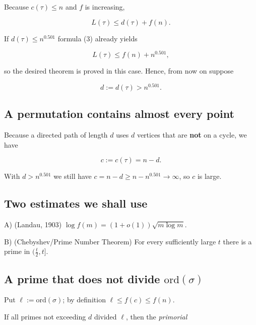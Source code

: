 \documentclass[12pt,a4paper]{article}
\theoremstyle{definition}
\begin{document}
    Because $c(\tau) \leq n$ and $f$ is increasing,

    \begin{equation}
        L(\tau) \leq d(\tau) + f(n).
    \end{equation}

    If $d(\tau) \leq n^{0.501}$ formula (3) already yields

    \begin{equation}
        L(\tau) \leq f(n) + n^{0.501},
    \end{equation}

    so the desired theorem is proved in this case.
    Hence, from now on suppose

    \begin{equation}
        d := d(\tau) > n^{0.501}.
    \end{equation}

    \subsection*{A permutation contains almost every point}

    Because a directed path of length $d$ uses $d$ vertices that are \textbf{not}
    on a cycle, we have

    \begin{equation}
        c := c(\tau) = n - d.
    \end{equation}

    With $d > n^{0.501}$ we still have $c = n - d \geq n - n^{0.501} \to \infty$, so
    $c$ is large.

    \subsection*{Two estimates we shall use}

    A) (Landau, 1903) $\log f(m) = (1 + o(1))\sqrt{m \log m}$.

    B) (Chebyshev/Prime Number Theorem)
    For every sufficiently large $t$ there is a prime in $(\frac{t}{2}, t]$.

    \subsection*{A prime that does \textbf{not} divide $\text{ord}(\sigma)$}

    Put $\ell := \text{ord}(\sigma)$; by definition $\ell \leq f(c) \leq f(n)$.

    If all primes not exceeding $d$ divided $\ell$, then the \emph{primorial}
\end{document}
